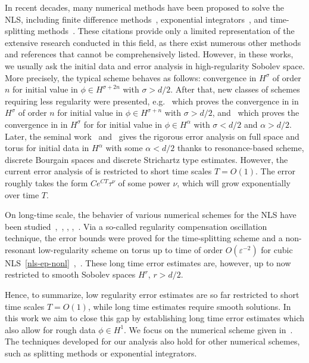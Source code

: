\documentclass[10pt,a4paper]{article}
\begin{document}
  In recent decades, many numerical methods have been proposed to solve the NLS,
  including finite difference methods~\cite{BDDLV21}, exponential integrators~\cite{HO10}, and time-splitting 
  methods~\cite{BDD02,Lub08,Tha12}. 
  These citations provide only a limited representation of the extensive research
  conducted in this field, as there exist numerous other methods and references 
  that cannot be comprehensively listed. 
  However, in these works, we usually ask the initial data and error analysis in
  high-regularity Sobolev space. More precisely, the typical scheme behaves as
  follows: convergence in \(H^\sigma\) of order \(n\) for initial value in
  \(\phi \in H^{\sigma+2n}\) with \(\sigma > d/2\). After that, new classes of
  schemes requiring less regularity were presented, e.g.~\cite{OS18,OWY22} which
  proves the convergence in in \(H^\sigma\) of order \(n\) for initial value in
  \(\phi \in H^{\sigma+n}\) with \(\sigma > d/2\), and~\cite{AB23a} which proves 
  the convergence in in \(H^\sigma\) for for initial value in \(\phi \in
  H^\alpha\) with \(\sigma < d/2\) and \(\alpha > d/2\). Later, the seminal
  work~\cite{ORS21} and~\cite{ORS22b} gives the rigorous error analysis on full
  space and torus for
  initial data in \(H^\alpha\) with some \(\alpha < d/2\)
  thanks to resonance-based scheme, discrete Bourgain spaces and discrete Strichartz
  type estimates. However, the current error analysis of is restricted to
  short time scales \(T=O(1)\). The error roughly takes the form
  \(Ce^{CT}\tau^\nu\) of some power \(\nu\), which will grow exponentially
  over time \(T\). 

  On long-time scale, the behavier of various
  numerical schemes for the NLS have been 
  studied~\cite{CCMM15},~\cite{FGP10}, \cite{FGP10b}, \cite{GL10},~\cite{GL10b}. 
  Via a so-called regularity compensation oscillation technique, the 
  error bounds were proved for the time-splitting scheme and a non-resonant
  low-regularity scheme on torus up to time of order \(O(\varepsilon^{-2})\) for cubic
  NLS~\eqref{nls-ep-nonl}~\cite{BCF},~\cite{FMS23}.
  These long time error estimates are, however, up to now restricted to smooth
  Sobolev spaces \(H^r\), \(r>d/2\). 

  Hence, to summarize, low regularity error estimates
  are so far restricted to short time scales \(T=O(1)\), while long time estimates
  require smooth solutions.
  In this work we aim to close this gap by establishing long time error estimates 
  which also allow for rough data \(\phi \in H^1\). We focus on the numerical scheme 
  given in~\cite{ORS21}. The techniques developed for our analysis also hold for 
  other numerical schemes, such as splitting methods or exponential integrators.
\end{document}
